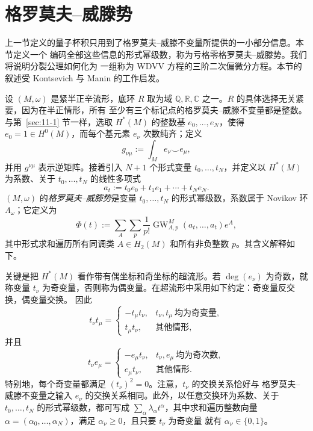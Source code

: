 
\section{格罗莫夫--威滕势}\label{sec:11-2}

上一节定义的量子杯积只用到了格罗莫夫--威滕不变量所提供的一小部分信息。本节定义一个
编码全部这些信息的形式幂级数，称为亏格零格罗莫夫--威滕势。我们将说明分裂公理如何化为
一组称为 WDVV 方程的三阶二次偏微分方程。本节的叙述受 Kontsevich 与 Manin
 的工作启发。

设 $(M,\omega)$ 是紧半正辛流形，底环 $R$ 取为域
$\mathbb Q,\mathbb R,\mathbb C$ 之一。$R$ 的具体选择无关紧要，因为在半正情形，所有
至少有三个标记点的格罗莫夫--威滕不变量都是整数。与第~\ref{sec:11-1} 节一样，选取
$H^*(M)$ 的整数基 $e_0,\ldots,e_N$，使得 $e_0=1\in H^0(M)$，而每个基元素 $e_\nu$
次数纯齐；定义
\[
  g_{\nu\mu}:=\int_Me_\nu\smile e_\mu,
\]
并用 $g^{\nu\mu}$ 表示逆矩阵。接着引入 $N+1$ 个形式变量 $t_0,\ldots,t_N$，并定义以
$H^*(M)$ 为系数、关于 $t_0,\ldots,t_N$ 的线性多项式
\[
  a_t:=t_0e_0+t_1e_1+\cdots+t_Ne_N.
\]
$(M,\omega)$ 的\emph{格罗莫夫--威滕势}是变量 $t_0,\ldots,t_N$ 的形式幂级数，系数属于
Novikov 环 $\Lambda_\omega$；它定义为
\begin{equation}\label{eq:11-2-1}
  \Phi(t):=\sum_A\sum_p\frac1{p!}
  \operatorname{GW}_{A,p}^M(a_t,\ldots,a_t)e^A,
\end{equation}
其中形式求和遍历所有同调类 $A\in H_2(M)$ 和所有非负整数 $p$。其含义解释如下。

关键是把 $H^*(M)$ 看作带有偶坐标和奇坐标的超流形。若 $\deg(e_\nu)$ 为奇数，就称变量
$t_\nu$ 为奇变量，否则称为偶变量。在超流形中采用如下约定：奇变量反交换，偶变量交换。
因此
\begin{equation}\label{eq:11-2-2}
  t_\nu t_\mu=
  \begin{cases}
  -t_\mu t_\nu,&t_\nu,t_\mu\ \text{均为奇变量},\\
  t_\mu t_\nu,&\text{其他情形},
  \end{cases}
\end{equation}
并且
\begin{equation}\label{eq:11-2-3}
  t_\nu e_\mu=
  \begin{cases}
  -e_\mu t_\nu,&t_\nu,e_\mu\ \text{均为奇次数},\\
  e_\mu t_\nu,&\text{其他情形}.
  \end{cases}
\end{equation}
特别地，每个奇变量都满足 $(t_\nu)^2=0$。注意，$t_\nu$ 的交换关系恰好与
格罗莫夫--威滕不变量之输入 $e_\nu$ 的交换关系相同。此外，以任意交换环为系数、关于
$t_0,\ldots,t_N$ 的形式幂级数，都可写成
$\sum_\alpha\lambda_\alpha t^\alpha$，其中求和遍历整数向量
$\alpha=(\alpha_0,\ldots,\alpha_N)$，满足 $\alpha_\nu\ge0$，且只要 $t_\nu$ 为奇变量
就有 $\alpha_\nu\in\{0,1\}$。

